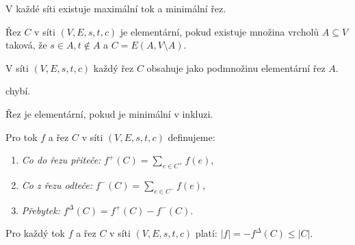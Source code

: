 \begin{t_fact}
  V každé síti existuje maximální tok a minimální řez.
\end{t_fact}

\begin{t_definition}
  Řez $C$ v síti $(V, E, s, t, c)$ je elementární, pokud existuje množina vrcholů $A\subseteq V$ taková, že $s\in A,t\notin A$ a $C=E(A,V\setminus A)$.
\end{t_definition}

\begin{t_lemma}
  V síti $(V, E, s, t, c)$ každý řez $C$ obsahuje jako podmnožinu elementární řez $A$.
\end{t_lemma}

\begin{t_proof}
  chybí. %
\end{t_proof}

\begin{t_corollary}
  Řez je elementární, pokud je minimální v inkluzi.
\end{t_corollary}

\begin{t_definition}
  Pro tok $f$ a řez $C$ v síti $(V, E, s, t, c)$ definujeme:
  \begin{enumerate}
    \item \textit{Co do řezu přiteče:} $f^+(C)=\sum_{e\in C^+} f(e)$,
    \item \textit{Co z řezu odteče:} $f^-(C)=\sum_{e\in C^-} f(e)$,
    \item \textit{Přebytek:} $f^\Delta(C)=f^+(C)-f^-(C)$.
  \end{enumerate}
\end{t_definition}

\begin{t_lemma}
  Pro každý tok $f$ a řez $C$ v síti $(V, E, s, t, c)$ platí: $|f|=-f^\Delta(C)\leq|C|$.
\end{t_lemma}

